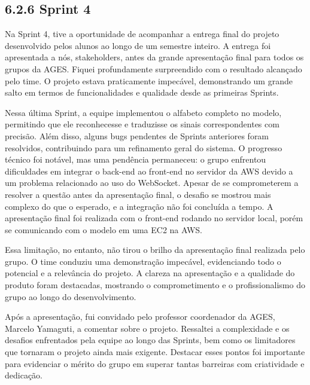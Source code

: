 \hypertarget{__RefHeading___Toc4470_311817663332}{}

\subsection*{6.2.6 Sprint 4}
\label{cliente-hoortech:text-h-0035}

Na Sprint 4, tive a oportunidade de acompanhar a entrega final do projeto desenvolvido pelos alunos ao longo de um semestre inteiro. A entrega foi apresentada a nós, stakeholders, antes da grande apresentação final para todos os grupos da AGES. Fiquei profundamente surpreendido com o resultado alcançado pelo time. O projeto estava praticamente impecável, demonstrando um grande salto em termos de funcionalidades e qualidade desde as primeiras Sprints.\par

Nessa última Sprint, a equipe implementou o alfabeto completo no modelo, permitindo que ele reconhecesse e traduzisse os sinais correspondentes com precisão. Além disso, alguns bugs pendentes de Sprints anteriores foram resolvidos, contribuindo para um refinamento geral do sistema. O progresso técnico foi notável, mas uma pendência permaneceu: o grupo enfrentou dificuldades em integrar o back-end ao front-end no servidor da AWS devido a um problema relacionado ao uso do WebSocket. Apesar de se comprometerem a resolver a questão antes da apresentação final, o desafio se mostrou mais complexo do que o esperado, e a integração não foi concluída a tempo. A apresentação final foi realizada com o front-end rodando no servidor local, porém se comunicando com o modelo em uma EC2 na AWS.\par

Essa limitação, no entanto, não tirou o brilho da apresentação final realizada pelo grupo. O time conduziu uma demonstração impecável, evidenciando todo o potencial e a relevância do projeto. A clareza na apresentação e a qualidade do produto foram destacadas, mostrando o comprometimento e o profissionalismo do grupo ao longo do desenvolvimento.\par

Após a apresentação, fui convidado pelo professor coordenador da AGES, Marcelo Yamaguti, a comentar sobre o projeto. Ressaltei a complexidade e os desafios enfrentados pela equipe ao longo das Sprints, bem como os limitadores que tornaram o projeto ainda mais exigente. Destacar esses pontos foi importante para evidenciar o mérito do grupo em superar tantas barreiras com criatividade e dedicação.\par

